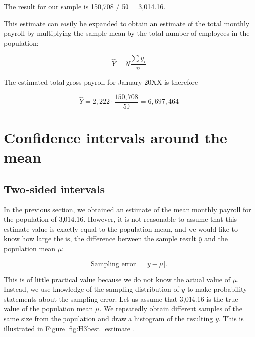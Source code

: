 The result for our sample is 150,708 / 50 = 3,014.16.

\bigskip

This estimate can easily be expanded to obtain an estimate of the total monthly payroll by multiplying the sample mean by the total number of employees in the population:

\begin{equation}
  \hat{Y} = N\frac{\sum y_i}{n} 
  \label{eq:estimate_total}
\end{equation} 

The estimated total gross payroll for January 20XX is therefore

\begin{equation*}
\hat{Y} = 2,222 \cdot \frac{150,708}{50} = 6,697,464
\end{equation*}


\section{Confidence intervals around the mean} %
\label{sec:confidence_intervals}

\subsection{Two-sided intervals} %
\label{sub:two_sided_intervals}

In the previous section, we obtained an estimate of the mean monthly payroll for the population of 3,014.16. However, it is not reasonable to assume that this estimate value is exactly equal to the population mean, and we would like to know how large the  is, the difference between the sample result $\bar{y}$ and the population mean $\mu$:

\begin{equation}
  \textrm{Sampling error} = | \bar{y} - \mu |.
\end{equation}

This is of little practical value because we do not know the actual value of $\mu$. Instead, we use knowledge of the sampling distribution of $\bar{y}$ to make probability statements about the sampling error. Let us assume that 3,014.16 is the true value of the population mean $\mu$. We repeatedly obtain different samples of the same size from the population and draw a histogram of the resulting $\bar{y}$. This is illustrated in Figure \ref{fig:H3best_estimate}.

